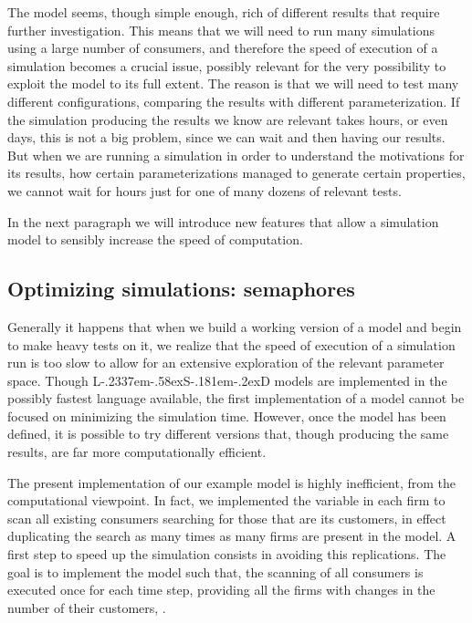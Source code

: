\documentclass [11pt,a4paper] {book}
\def\LsD{{L\kern-.2337em\lower-.58ex\hbox{S}\kern-.181em\lower-.2ex\hbox{D}}\xspace}
\begin{document}
The model seems, though simple enough, rich of different results that require further investigation. This means that we will need to run many simulations using a large number of consumers, and therefore the speed of execution of a simulation becomes a crucial issue, possibly relevant for the very possibility to exploit the model to its full extent. The reason is that we will need to test many different configurations, comparing the results with different parameterization. If the simulation producing the results we know are relevant takes hours, or even days, this is not a big problem, since we can wait and then having our results. But when we are running a simulation in order to understand the motivations for its results, how certain parameterizations managed to generate certain properties, we cannot wait for hours just for one of many dozens of relevant tests.

In the next paragraph we will introduce new features that allow a simulation model to sensibly increase the speed of computation.




\subsection{Optimizing simulations: semaphores}

Generally it happens that when we build a working version of a model and begin to make heavy tests on it, we realize that the speed of execution of a simulation run is too slow to allow for an extensive exploration of the relevant parameter space. Though \LsD models are implemented in the possibly fastest language available, the first implementation of a model cannot be focused on minimizing the simulation time. However, once the model has been defined, it is possible to try different versions that, though producing the same results, are far more computationally efficient. 

The present implementation of our example model is highly inefficient, from the computational viewpoint. In fact, we implemented the variable  in each firm to scan all existing consumers searching for those that are its customers, in effect duplicating the search as many times as many firms are present in the model. A first step to speed up the simulation consists in avoiding this replications. The goal is to implement the model such that, the scanning of all consumers is executed once for each time step, providing all the firms with changes in the number of their customers, .
\end{document}
